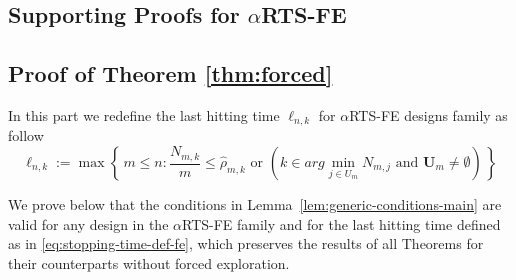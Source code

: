 \documentclass[11pt]{article}
\theoremstyle{plain}
\theoremstyle{definition}
\begin{document}
\begin{appendix}
%
%

		
		\section{Supporting Proofs for $\alpha$RTS-FE}\label{appnB}

\subsection{Proof of Theorem \ref{thm:forced}}
In this part we redefine the last hitting time $\ell_{n,k}$ for \(\alpha\)RTS-FE designs family as follow
\begin{equation}\label{eq:stopping-time-def-fe}
	\ell_{n,k} := \max \left\{\, m \leq n : \frac{N_{m,k}}{m} \leq \hat{\rho}_{m,k} \text{ or } \left(k \in arg\!\min_{j \in U_m} N_{m,j}\text{ and } \mathbf{U}_m \neq \emptyset\right) \,\right\}
\end{equation}

We prove below that the conditions in Lemma~\ref{lem:generic-conditions-main} are valid for any design in the \(\alpha\)RTS-FE family and for the last hitting time defined as in \eqref{eq:stopping-time-def-fe}, which preserves the results of all Theorems for their counterparts without forced exploration.


\end{appendix}
\end{document}
